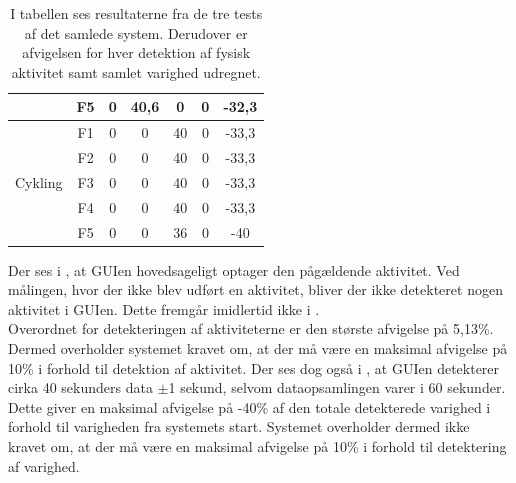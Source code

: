 \begin{table}[H]
{\begin{tabular}{ccccccc}
		& F5                                                                                                    & 0     & 40,6                                                                                           & 0         & 0 & -32,3  \\ \hline
		\multirow{5}{*}{Cykling}     & F1     & 0        & 0     & 40    & 0    & -33,3  \\ 
		& F2             & 0                                                                                                & 0                                                                                                & 40       & 0 & -33,3                                                                                             \\
		& F3             & 0                                                                                                  & 0                                                                                                & 40      & 0   & -33,3                                                                                           \\
		& F4             & 0                                                                                                  & 0                                                                                                & 40    & 0   & -33,3                                                                                              \\
		& F5             & 0                                                                                                  & 0                                                                                                & 36 & 0 & -40  \\ \hline                                                                                                
		\end{tabular}
	}
		\caption{I tabellen ses resultaterne fra de tre tests af det samlede system. Derudover er afvigelsen for hver detektion af fysisk aktivitet samt samlet varighed udregnet.}
		\label{tab:samlet_sys_test1}
\end{table}\vspace{-.25cm}
Der ses i , at GUIen hovedsageligt optager den pågældende aktivitet. Ved målingen, hvor der ikke blev udført en aktivitet, bliver der ikke detekteret nogen aktivitet i GUIen. Dette fremgår imidlertid ikke i . \\
Overordnet for detekteringen af aktiviteterne er den største afvigelse på 5,13\%. Dermed overholder systemet kravet om, at der må være en maksimal afvigelse på 10\% i forhold til detektion af aktivitet. Der ses dog også i , at GUIen detekterer cirka 40 sekunders data $\pm$1 sekund, selvom dataopsamlingen varer i 60 sekunder. Dette giver en maksimal afvigelse på -40\% af den totale detekterede varighed i forhold til varigheden fra systemets start. Systemet overholder dermed ikke kravet om, at der må være en maksimal afvigelse på 10\% i forhold til detektering af varighed.

